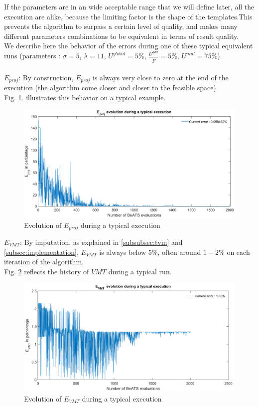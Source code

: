 If the parameters are in an wide acceptable range that we will define later, all the execution are alike, because the limiting factor is the shape of the templates.This prevents the algorithm to surpass a certain level of quality, and makes many different parameters combinations to be equivalent in terms of result quality.\\
We describe here the behavior of the errors during one of these typical equivalent runs (parameters : $\sigma=5$, $\lambda=11$, $U^{global}=5\% $, $\frac{U^{add}}{\widetilde{F}}=5\% $, $U^{mul}=75 \% $).\\
\\
\emph{$E_{proj}$}: By construction, $E_{proj}$ is always very close to zero at the end of the execution (the algorithm come closer and closer to the feasible space).\\
Fig. \ref{fig:eprojexample}. illustrates this behavior on a typical example.\\ 
\begin{figure}[!h]
	\caption{Evolution of $E_{proj}$ during a typical execution}
	\label{fig:eprojexample}
	\includegraphics[width=7in]{figures/results_figures/eprojexample.png}
\end{figure}	
\newpage 
\emph{$E_{VMT}$}: By imputation, as explained in \ref{subsubsec:tvm} and \ref{subsec:implementation}, $E_{VMT}$ is always below $5\%$, often around $1-2\%$ on each iteration of the algorithm.\\
Fig. \ref{fig:vmtexample} reflects the history of $VMT$ during a typical run.\\
\begin{figure}[!h]
	\caption{Evolution of $E_{VMT}$ during a typical execution}
	\label{fig:vmtexample}
	\includegraphics[width=7in]{figures/results_figures/VMTexample.png}
\end{figure}	
